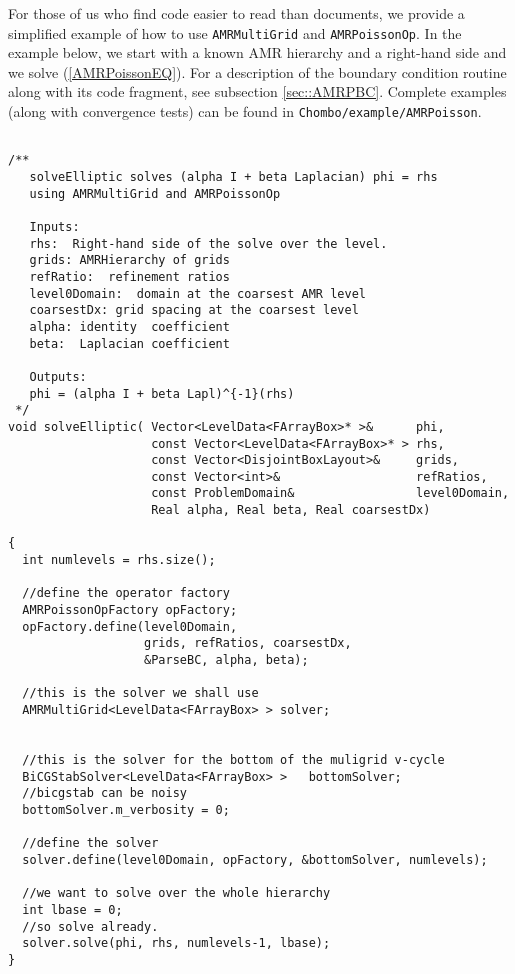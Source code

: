 For those of us who find code easier to read than documents, we
provide a simplified  example of  how to use {\tt  AMRMultiGrid} 
and {\tt AMRPoissonOp}. In the example below, we start with a known
AMR hierarchy and a right-hand side and we solve (\ref{AMRPoissonEQ}).
For a description of the boundary condition routine along with its
code fragment, see subsection \ref{sec::AMRPBC}.    Complete
examples (along with convergence tests) can be found in 
{\tt  Chombo/example/AMRPoisson}. 
\begin{scriptsize}
\begin{verbatim}

/**
   solveElliptic solves (alpha I + beta Laplacian) phi = rhs
   using AMRMultiGrid and AMRPoissonOp
   
   Inputs:  
   rhs:  Right-hand side of the solve over the level.
   grids: AMRHierarchy of grids
   refRatio:  refinement ratios
   level0Domain:  domain at the coarsest AMR level 
   coarsestDx: grid spacing at the coarsest level
   alpha: identity  coefficient
   beta:  Laplacian coefficient

   Outputs:
   phi = (alpha I + beta Lapl)^{-1}(rhs)
 */
void solveElliptic( Vector<LevelData<FArrayBox>* >&      phi,
                    const Vector<LevelData<FArrayBox>* > rhs,
                    const Vector<DisjointBoxLayout>&     grids,
                    const Vector<int>&                   refRatios,
                    const ProblemDomain&                 level0Domain,
                    Real alpha, Real beta, Real coarsestDx)

{
  int numlevels = rhs.size();
  
  //define the operator factory
  AMRPoissonOpFactory opFactory;
  opFactory.define(level0Domain,
                   grids, refRatios, coarsestDx, 
                   &ParseBC, alpha, beta);

  //this is the solver we shall use
  AMRMultiGrid<LevelData<FArrayBox> > solver;


  //this is the solver for the bottom of the muligrid v-cycle
  BiCGStabSolver<LevelData<FArrayBox> >   bottomSolver;
  //bicgstab can be noisy
  bottomSolver.m_verbosity = 0;

  //define the solver
  solver.define(level0Domain, opFactory, &bottomSolver, numlevels);

  //we want to solve over the whole hierarchy
  int lbase = 0;
  //so solve already.
  solver.solve(phi, rhs, numlevels-1, lbase);
}

\end{verbatim}
\end{scriptsize}




